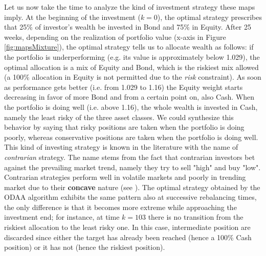 Let us now take the time to analyze the kind of investment strategy these maps imply. At the beginning of the investment ($k=0$), the optimal strategy prescribes that 25\% of investor's wealth be invested in Bond and 75\% in Equity. After 25 weeks, depending on the realization of portfolio value (x-axis in Figure \ref{fig:mapsMixture}), the optimal strategy tells us to allocate wealth as follows: if the portfolio is underperforming (e.g. its value is approximately below 1.029), the optimal allocation is a mix of Equity and Bond, which is the riskiest mix allowed (a 100\% allocation in Equity is not permitted due to the \textit{risk} constraint). As soon as performance gets better (i.e. from 1.029 to 1.16) the Equity weight starts decreasing in favor of more Bond and from a certain point on, also Cash. When the portfolio is doing well (i.e. above 1.16), the whole wealth is invested in Cash, namely the least risky of the three asset classes. We could synthesize this behavior by saying that risky positions are taken when the portfolio is doing poorly, whereas conservative positions are taken when the portfolio is doing well. This kind of investing strategy is known in the literature with the name of \textit{contrarian} strategy. The name stems from the fact that contrarian investors bet against the prevailing market trend, namely they try to sell "high" and buy "low". Contrarian strategies perform well in volatile markets and poorly in trending market due to their \textbf{concave} nature (see \cite{Perold1988}).
The optimal strategy obtained by the \gls{ODAA} algorithm exhibits the same pattern also at successive rebalancing times, the only difference is that it becomes more extreme while approaching the investment end; for instance, at time $k=103$ there is no transition from the riskiest allocation to the least risky one. In this case, intermediate position are discarded since either the target has already been reached (hence a 100\% Cash position) or it has not (hence the riskiest position).

